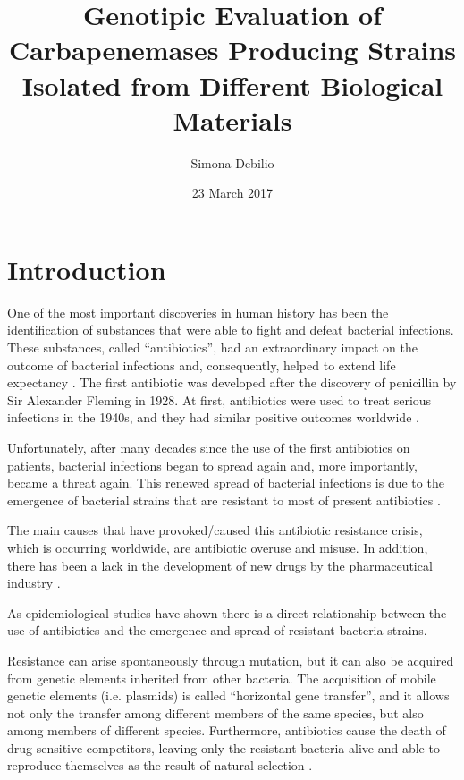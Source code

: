 \documentclass[11pt]{report}
\title{\textbf{Genotipic Evaluation of Carbapenemases Producing Strains Isolated from Different Biological Materials}}
\author{Simona Debilio}
\date{23 March 2017}
\begin{document}
\maketitle

\tableofcontents

\chapter{Introduction}
One of the most important discoveries in human history has been the identification of substances that were able to fight and defeat bacterial infections.
These substances, called “antibiotics”, had an extraordinary impact on the outcome of bacterial infections and, consequently, helped to extend life expectancy \cite{ventola2015antibiotic}. 
The first antibiotic was developed after the discovery of penicillin by Sir Alexander Fleming in 1928.
At first, antibiotics were used to treat serious infections in the 1940s, and they had similar positive outcomes worldwide \cite{Spellberg2014}.

Unfortunately, after many decades since the use of the first antibiotics on patients, bacterial infections began to spread again and, more importantly, became a threat again.
This renewed spread of bacterial infections is due to the emergence of bacterial strains that are resistant to most of present antibiotics \cite{ventola2015antibiotic}.

The main causes that have provoked/caused this antibiotic resistance crisis, which is occurring worldwide, are antibiotic overuse and misuse. In addition, there has been a lack in the development of new drugs by the pharmaceutical industry \cite{nature2013}.

As epidemiological studies have shown there is a direct relationship between the use of antibiotics and the emergence and spread of resistant bacteria strains.

Resistance can arise spontaneously through mutation, but it can also be acquired from genetic elements inherited from other bacteria. The acquisition of mobile genetic elements (i.e. plasmids) is called “horizontal gene transfer”, and it allows not only the transfer among different members of the same species, but also among members of different species.
Furthermore, antibiotics cause the death of drug sensitive competitors, leaving only the resistant bacteria alive and able to reproduce themselves as the result of natural selection \cite{doi:10.1093/emph/eou024}.
\end{document}
